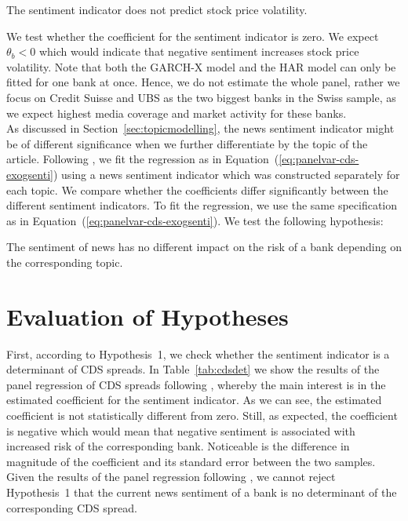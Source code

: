 \begin{hyp}
	The sentiment indicator does not predict stock price volatility.
\end{hyp} 

We test whether the coefficient for the sentiment indicator is zero. We expect $\theta_b<0$ which would indicate that negative sentiment increases stock price volatility. Note that both the GARCH-X model and the HAR model can only be fitted for one bank at once. Hence, we do not estimate the whole panel, rather we focus on Credit Suisse and UBS as the two biggest banks in the Swiss sample, as we expect highest media coverage and market activity for these banks. \\

As discussed in \mbox{Section~\ref{sec:topicmodelling}}, the news sentiment indicator might be of different significance when we further differentiate by the topic of the article. Following \cite{roeder2020}, we fit the regression as in \mbox{Equation~(\ref{eq:panelvar-cds-exogsenti})} using a news sentiment indicator which was constructed separately for each topic. We compare whether the coefficients differ significantly between the different sentiment indicators. To fit the regression, we use the same specification as in \mbox{Equation~(\ref{eq:panelvar-cds-exogsenti})}. We test the following hypothesis:

\begin{hyp}
	The sentiment of news has no different impact on the risk of a bank depending on the corresponding topic.
\end{hyp}


\section{Evaluation of Hypotheses} \label{sec:results}

First, according to \mbox{Hypothesis~1}, we check whether the sentiment indicator is a determinant of CDS spreads. In \mbox{Table~\ref{tab:cdsdet}} we show the results of the panel regression of CDS spreads following \cite{annaert2013}, whereby the main interest is in the estimated coefficient for the sentiment indicator. As we can see, the estimated coefficient is not statistically different from zero. Still, as expected, the coefficient is negative which would mean that negative sentiment is associated with increased risk of the corresponding bank. Noticeable is the difference in magnitude of the coefficient and its standard error between the two samples. Given the results of the panel regression following \cite{annaert2013}, we cannot reject \mbox{Hypothesis~1} that the current news sentiment of a bank is no determinant of the corresponding CDS spread. \\

